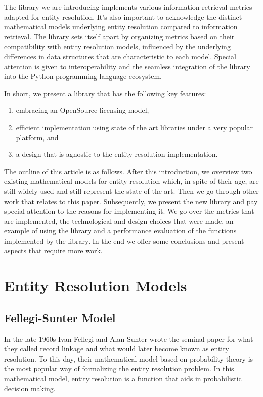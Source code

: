 \documentclass[a4paper,twoside]{article}
\begin{document}
    The library we are introducing implements various information retrieval
    metrics adapted for entity resolution.
    It's also important to acknowledge the distinct mathematical models
    underlying entity resolution compared to information retrieval.
    The library sets itself apart by organizing metrics based on their
    compatibility with entity resolution models, influenced by the underlying
    differences in data structures that are characteristic to each model.
    Special attention is given to interoperability and the seamless integration
    of the library into the Python programming language ecosystem.

    In short, we present a library that has the following key features:

    \begin{enumerate}
        \item embracing an OpenSource licensing model,
        \item efficient implementation using state of the art libraries under
        a very popular platform, and
        \item a design that is agnostic to the entity resolution implementation.
    \end{enumerate} 

    The outline of this article is as follows.
    After this introduction, we overview two existing mathematical models for
    entity resolution which, in spite of their age, are still widely used and
    still represent the state of the art.
    Then we go through other work that relates to this paper.
    Subsequently, we present the new library and pay special attention to the
    reasons for implementing it.
    We go over the metrics that are implemented, the technological and design
    choices that were made, an example of using the library and a performance
    evaluation of the functions implemented by the library.
    In the end we offer some conclusions and present aspects that require more
    work.

    \section{Entity Resolution Models}\label{sec:models}
    \subsection{Fellegi-Sunter Model}
    In the late 1960s Ivan Fellegi and Alan Sunter wrote the seminal
    paper\cite{fs1969} for what they called record linkage and what would later
    become known as entity resolution.
    To this day, their mathematical model based on probability theory is the
    most popular way of formalizing the entity resolution problem.
    In this mathematical model, entity resolution is a function that aids in 
    probabilistic decision making.
    
\end{document}
